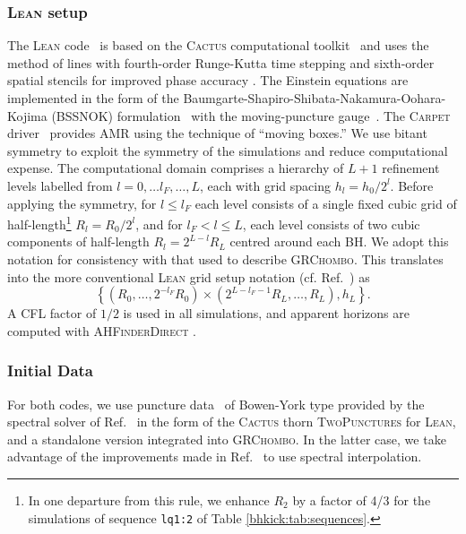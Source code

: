 \subsubsection{\textsc{Lean} setup}
\label{bhkick:sec:lean}
The \textsc{Lean} code~\cite{Sperhake:2006cy} is based on the
\textsc{Cactus} computational toolkit~\cite{Goodale2002a} and uses
the method of lines with fourth-order Runge-Kutta time stepping and
sixth-order spatial stencils for improved phase accuracy
\cite{Husa:2007hp}. The Einstein equations are implemented in the form
of the Baumgarte-Shapiro-Shibata-Nakamura-Oohara-Kojima (BSSNOK)
formulation~\cite{Nakamura:1987zz,Shibata:1995we,Baumgarte:1998te}
with the moving-puncture gauge~\cite{Campanelli:2005dd,Baker:2005vv}.
The \textsc{Carpet} driver~\cite{Schnetter:2003rb} provides AMR using
the technique of ``moving boxes.'' We use bitant symmetry to exploit
the symmetry of the simulations and reduce computational expense.
The computational domain
comprises a hierarchy of $L+1$ refinement levels labelled from
$l=0,\ldots l_F,\ldots,L$, each with grid spacing $h_l=h_0/2^l$.
Before applying the symmetry, for $l\leq l_F$ each level consists of
a single fixed cubic grid of half-length\footnote{In one departure from
this rule, we enhance $R_2$ by a factor of 4/3 for the simulations
of sequence \texttt{lq1:2} of Table \ref{bhkick:tab:sequences}.}
$R_l=R_0/2^l$, and for
$l_F<l\leq L$, each level consists of two cubic components of
half-length $R_l=2^{L-l}R_L$ centred around each BH. We adopt this
notation for consistency with that used to describe \textsc{GRChombo}.
This translates into the more conventional \textsc{Lean} grid setup
notation (cf. Ref.~\cite{Sperhake:2006cy}) as
\begin{equation}
    \left\{(R_0,\ldots,2^{-l_F}R_0) \times
    (2^{L-l_F-1}R_L,\ldots,R_L),h_L\right\}.
\end{equation}
A CFL factor of $1/2$ is used in all simulations, and apparent horizons
are computed with \textsc{AHFinderDirect}
\cite{Thornburg:1995cp,Thornburg:2003sf}.

\subsubsection{Initial Data}
For both codes, we use puncture data~\cite{Brandt:1997tf} of
Bowen-York \cite{Bowen:1980yu} type provided by the spectral solver of
Ref.~\cite{Ansorg:2004ds} in the form of the \textsc{Cactus} thorn
\textsc{TwoPunctures} for \textsc{Lean}, and a standalone version
integrated into \textsc{GRChombo}.  In the latter case, we take
advantage of the improvements made in Ref.~\cite{Paschalidis:2013oya}
to use spectral interpolation.

